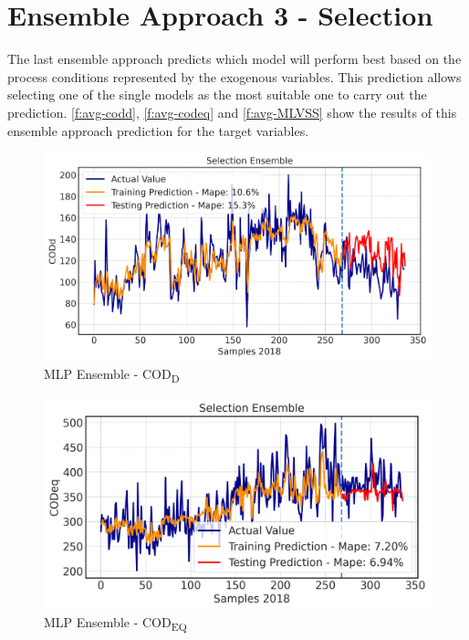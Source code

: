 \section{Ensemble Approach 3 - Selection}
The last ensemble approach predicts which model will perform best based on the process conditions represented by the exogenous variables. This prediction allows selecting one of the single models as the most suitable one to carry out the prediction. \autoref{f:avg-codd}, \autoref{f:avg-codeq} and \autoref{f:avg-MLVSS} show the results of this ensemble approach prediction for the target variables. 

\begin{figure}[h!]
\centering
\includegraphics[width=\linewidth]{figures/Ch5/CODd-ann2.pdf}
\caption{MLP Ensemble - COD\textsubscript{D}}
\label{f:ann2-codd}
\end{figure}

\begin{figure}[h!]
\centering
\includegraphics[width=\linewidth]{figures/Ch5/CODeq-ann2.pdf}
\caption{MLP Ensemble - COD\textsubscript{EQ}}
\label{f:ann2-codeq}
\end{figure}


